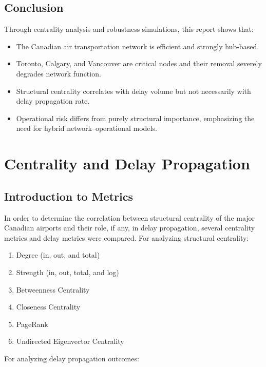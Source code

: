 \documentclass[9pt]{article}
\begin{document}
\subsection{Conclusion}

Through centrality analysis and robustness simulations, this report shows that:

\begin{itemize}
    \item The Canadian air transportation network is efficient and strongly hub-based.
    \item Toronto, Calgary, and Vancouver are critical nodes and their removal severely degrades network function.
    \item Structural centrality correlates with delay volume but not necessarily with delay propagation rate.
    \item Operational risk differs from purely structural importance, emphasizing the need for hybrid network–operational models.
\end{itemize}

\section{Centrality and Delay Propagation}
\subsection{Introduction to Metrics}

In order to determine the correlation between structural centrality of the major Canadian airports and their role, if any, in delay propagation, several centrality metrics and delay metrics were compared. For analyzing structural centrality:

\begin{enumerate}[label=\arabic*.]
    \item Degree (in, out, and total)
    \item Strength (in, out, total, and log)
    \item Betweenness Centrality
    \item Closeness Centrality
    \item PageRank
    \item Undirected Eigenvector Centrality
\end{enumerate}

\noindent
For analyzing delay propagation outcomes:
\end{document}
